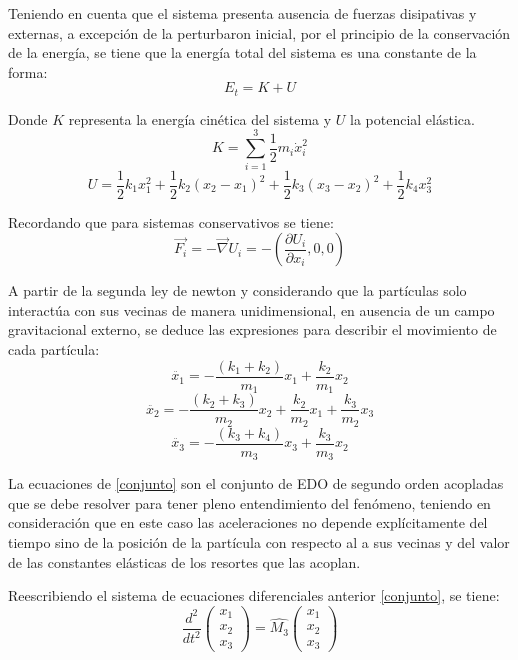 \documentclass[11pt,letterpaper,twocolumn]{article}
\begin{document}
\par 
Teniendo en cuenta que el sistema presenta ausencia de fuerzas disipativas y externas, a excepción de la perturbaron inicial, por el principio de la conservación de la energía, se tiene que la energía total del sistema es una constante de la forma:
$$E_{t}=K+U$$
\par 
Donde $K$ representa la energía cinética del sistema y $U$ la potencial elástica. 
$$K=\sum_{i=1}^{3} \dfrac{1}{2} m_{i} \dot{x}_{i}^{2}$$ 
$$U=\dfrac{1}{2}k_{1}x_{1}^{2} +  \dfrac{1}{2}k_{2}(x_{2}-x_{1})^{2} + \dfrac{1}{2}k_{3}(x_{3}-x_{2})^{2} + \dfrac{1}{2}k_{4}x_{3}^{2}$$
\par 
Recordando que para sistemas conservativos se tiene:
$$\vec{F_{i}}=- \vec{\nabla}U_{i}=-(\dfrac{\partial U_{i}}{\partial x_{i}},0,0)$$ 
\par 
A partir de la segunda ley de newton y considerando que la partículas solo interactúa con sus vecinas de manera unidimensional, en ausencia de un campo gravitacional externo, se deduce las expresiones para describir el movimiento de cada partícula:
$$\ddot{x_{1}}=-\dfrac{(k_{1}+k_{2})}{m_{1}}x_{1} + \dfrac{k_{2}}{m_{1}}x_{2}$$
\begin{equation}
\ddot{x_{2}}=-\dfrac{(k_{2}+k_{3})}{m_{2}}x_{2} + \dfrac{k_{2}}{m_{2}}x_{1} + \dfrac{k_{3}}{m_{2}}x_{3}
\label{conjunto}
\end{equation}
$$\ddot{x_{3}}=-\dfrac{(k_{3}+k_{4})}{m_{3}}x_{3} + \dfrac{k_{3}}{m_{3}}x_{2}$$
\par 
La ecuaciones de \ref{conjunto} son el conjunto de EDO de segundo orden acopladas que se debe resolver para tener pleno entendimiento del fenómeno, teniendo en consideración que en este caso las aceleraciones no depende explícitamente del tiempo sino de la posición de la partícula con respecto al a sus vecinas y del valor de las constantes elásticas de los resortes que las acoplan.\\
\par 
Reescribiendo el sistema de ecuaciones diferenciales anterior \ref{conjunto}, se tiene: 
\[
\dfrac{d^{2}}{dt^{2}} \left(
\begin{matrix}
x_{1}\\
x_{2}\\
x_{3}
\end{matrix} \right) = \hat{M_{3}}  \left(
\begin{matrix}
x_{1}\\
x_{2}\\
x_{3}
\end{matrix} \right)
\] 
\end{document}
